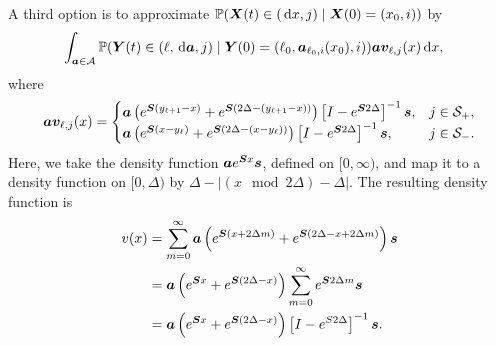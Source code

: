 A third option is to approximate \(\mathbb P(\boldsymbol X(t)\in{}(\, \mathrm{d} x, j)\mid \boldsymbol X(0)=(x_0, i)) \) by
\begin{align}
	\label{eqn: density approx 4+}&
		\displaystyle\int_{\boldsymbol a \in\mathcal A}\mathbb P(\boldsymbol Y(t) \in{}(\ell, \, \mathrm{d} \boldsymbol a,j)\mid \boldsymbol Y(0) = (\ell_0, \boldsymbol  a_{\ell_0,i}(x_0), i)) \boldsymbol a \boldsymbol v_{\ell,j}(x) \, \mathrm{d} x ,
\end{align}
{where}
\begin{align}
		\boldsymbol a \boldsymbol v_{\ell,j}(x) = \begin{cases}
			\boldsymbol a \left(e^{ \boldsymbol{S}(y_{\ell+1}-x)} + e^{ \boldsymbol{S}(2\Delta-(y_{\ell+1}-x))} \right)\left[I-e^{\boldsymbol S 2\Delta}\right]^{-1}\boldsymbol s, & j\in\mathcal{S}_+, \\ 
			\boldsymbol a \left(e^{ \boldsymbol{S}(x-y_\ell)}+e^{ \boldsymbol{S}(2\Delta-(x-y_\ell))}\right) \left[I-e^{\boldsymbol S 2\Delta}\right]^{-1}\boldsymbol s, & j\in\mathcal{S}_-. \\ 
		\end{cases}
\end{align}
Here, we take the density function \(\boldsymbol a e^{\boldsymbol S x}\boldsymbol s\), defined on \([0,\infty)\), and map it to a density function on \([0,\Delta)\) by \(\Delta - |(x \mod 2\Delta )-\Delta|\). The resulting density function is 
\begin{align*}
	v(x) &= \sum_{m=0}^\infty \boldsymbol a \left(e^{\boldsymbol S (x+2\Delta m)} + e^{\boldsymbol S (2\Delta -x+2\Delta m)} \right)\boldsymbol s
	\\&= \boldsymbol a \left(e^{\boldsymbol S x} + e^{\boldsymbol S (2\Delta -x)} \right)\sum_{m=0}^\infty e^{\boldsymbol S 2\Delta m} \boldsymbol s
	\\&= \boldsymbol a \left(e^{\boldsymbol S x} + e^{\boldsymbol S (2\Delta -x)} \right)\left[I-e^{S2\Delta}\right]^{-1} \boldsymbol s.
\end{align*}


